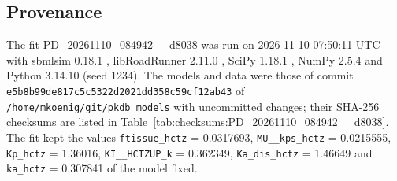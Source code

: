 \documentclass{article}
\begin{document}
\subsection{Provenance}

The fit PD\_20261110\_084942\_\_d8038 was run on 2026-11-10 07:50:11 UTC with sbmlsim 0.18.1 \cite{Koenig2026_sbmlsim}, libRoadRunner 2.11.0 \cite{Welsh2023}, SciPy 1.18.1 \cite{Virtanen2020}, NumPy 2.5.4 \cite{Harris2020} and Python 3.14.10 (seed 1234). The models and data were those of commit \texttt{e5b8b99de817c5c5322d2021dd358c59cf12ab43} of \texttt{/home/mkoenig/git/pkdb\_models} with uncommitted changes; their SHA-256 checksums are listed in Table~\ref{tab:checksums:PD_20261110_084942__d8038}. The fit kept the values \texttt{ftissue\_hctz} = 0.0317693, \texttt{MU\_\_kps\_hctz} = 0.0215555, \texttt{Kp\_hctz} = 1.36016, \texttt{KI\_\_HCTZUP\_k} = 0.362349, \texttt{Ka\_dis\_hctz} = 1.46649 and \texttt{ka\_hctz} = 0.307841 of the model fixed.
\end{document}
